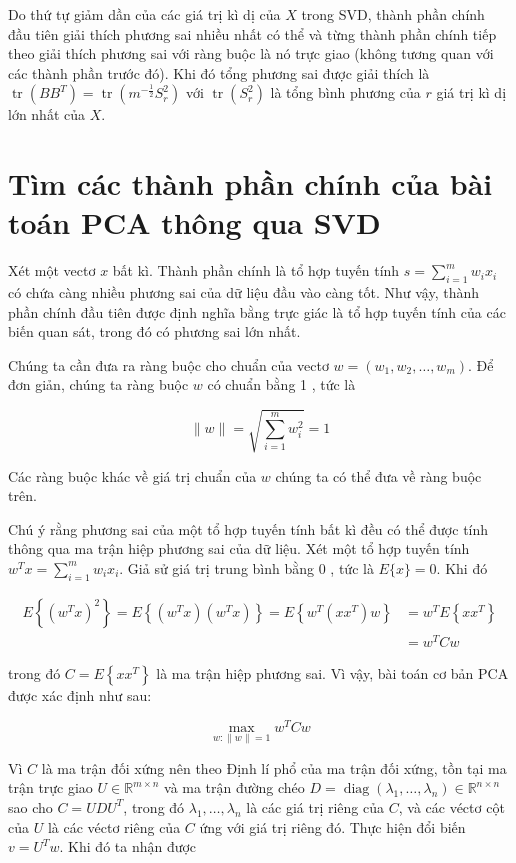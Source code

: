 \documentclass[12pt,a4paper,oneside]{report}
\numberwithin{equation}{section}
\begin{document}
Do thứ tự giảm dần của các giá trị kì dị của $X$ trong SVD, thành phần chính đầu tiên giải thích phương sai nhiều nhất có thể và từng thành phần chính tiếp theo giải thích phương sai với ràng buộc là nó trực giao (không tương quan với các thành phần trước đó). Khi đó tổng phương sai được giải thích là $\operatorname{tr}\left(B B^{T}\right)=\operatorname{tr}\left(m^{-\frac{1}{2}} S_{r}^{2}\right)$ với $\operatorname{tr}\left(S_{r}^{2}\right)$ là tổng bình phương của $r$ giá trị kì dị lớn nhất của $X$.



\section{Tìm các thành phần chính của bài toán PCA thông qua SVD}

Xét một vectơ $x$ bất kì. Thành phần chính là tổ hợp tuyến tính $s=\sum_{i=1}^{m} w_{i} x_{i}$ có chứa càng nhiều phương sai của dữ liệu đầu vào càng tốt. Như vậy, thành phần chính đầu tiên được định nghĩa bằng trực giác là tổ hợp tuyến tính của các biến quan sát, trong đó có phương sai lớn nhất.

Chúng ta cần đưa ra ràng buộc cho chuẩn của vectơ $w=\left(w_{1}, w_{2}, \ldots, w_{m}\right)$. Để đơn giản, chúng ta ràng buộc $w$ có chuẩn bằng 1 , tức là

$$
\|w\|=\sqrt{\sum_{i=1}^{m} w_{i}^{2}}=1
$$

Các ràng buộc khác về giá trị chuẩn của $w$ chúng ta có thể đưa về ràng buộc trên.

Chú ý rằng phương sai của một tổ hợp tuyến tính bất kì đều có thể được tính thông qua ma trận hiệp phương sai của dữ liệu. Xét một tổ hợp tuyến tính $w^{T} x=\sum_{i=1}^{m} w_{i} x_{i}$. Giả sử giá trị trung bình bằng 0 , tức là $E\{x\}=0$. Khi đó

$$
\begin{aligned}
	E\left\{\left(w^{T} x\right)^{2}\right\}=E\left\{\left(w^{T} x\right)\left(w^{T} x\right)\right\}=E\left\{w^{T}\left(x x^{T}\right) w\right\} & =w^{T} E\left\{x x^{T}\right\} \\
	& =w^{T} C w
\end{aligned}
$$

trong đó $C=E\left\{x x^{T}\right\}$ là ma trận hiệp phương sai. Vì vậy, bài toán cơ bản $\mathrm{PCA}$ được xác định như sau:

$$
\max _{w:\|w\|=1} w^{T} C w
$$

Vì $C$ là ma trận đối xứng nên theo Định lí phổ của ma trận đối xứng, tồn tại ma trận trực giao $U \in \mathbb{R}^{m \times n}$ và ma trận đường chéo $D=\operatorname{diag}\left(\lambda_{1}, \ldots, \lambda_{n}\right) \in \mathbb{R}^{n \times n}$ sao cho $C=U D U^{T}$, trong đó $\lambda_{1}, \ldots, \lambda_{n}$ là các giá trị riêng của $C$, và các véctơ cột của $U$ là các véctơ riêng của $C$ ứng với giá trị riêng đó. Thực hiện đổi biến $v=U^{T} w$. Khi đó ta nhận được
\end{document}
